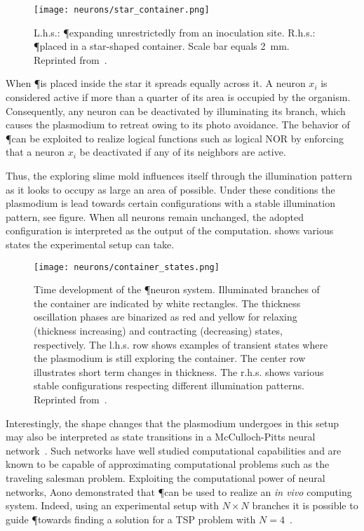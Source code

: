 			\begin{figure}[!htbp]
			\centering
			\texttt{[image: neurons/star\_container.png]}
			\caption[\P neurons setup]{L.h.s.: \P expanding unrestrictedly from an inoculation site. R.h.s.: \P placed in a star-shaped container. Scale bar equals \SI{2}{\milli\metre}. Reprinted from~\cite{Aono:2007:ANC:1284621.1284651}.}
			\label{fig:neurons_setup}
			\end{figure}

			When \P is placed inside the star it spreads equally across it. A neuron $x_i$ is considered active if more than a quarter of its area is occupied by the organism. Consequently, any neuron can be deactivated by illuminating its branch, which causes the plasmodium to retreat owing to its photo avoidance. The behavior of \P can be exploited to realize logical functions such as logical NOR by enforcing that a neuron $x_i$ be deactivated if any of its neighbors are active. 

			Thus, the exploring slime mold influences itself through the illumination pattern as it looks to occupy as large an area of possible. Under these conditions the plasmodium is lead towards certain configurations with a stable illumination pattern, see figure. When all neurons remain unchanged, the adopted configuration is interpreted as the output of the computation.  shows various states the experimental setup can take.

			\begin{figure}[!htbp]
			\centering
			\texttt{[image: neurons/container\_states.png]}
			\caption[\P neurons undergoing state transitions]{Time development of the \P neuron system. Illuminated branches of the container are indicated by white rectangles. The thickness oscillation phases are binarized as red and yellow for relaxing (thickness increasing) and contracting (decreasing) states, respectively. The l.h.s. row shows examples of transient states where the plasmodium is still exploring the container. The center row illustrates short term changes in thickness. The r.h.s. shows various stable configurations respecting different illumination patterns. Reprinted from~\cite{Aono:2007:ANC:1284621.1284651}. }
			\label{fig:neurons_states}
			\end{figure}

			Interestingly, the shape changes that the plasmodium undergoes in this setup may also be interpreted as state transitions in a McCulloch-Pitts neural network~\cite{Aono:2007:ANC:1284621.1284651}. Such networks have well studied computational capabilities and are known to be capable of approximating computational problems such as the traveling salesman problem. Exploiting the computational power of neural networks, Aono \etal demonstrated that \P can be used to realize an \textit{in vivo} computing system. Indeed, using an experimental setup with $N \times N$ branches it is possible to guide \P towards finding a solution for a TSP problem with $N=4$~\cite{Aono2009}. 

